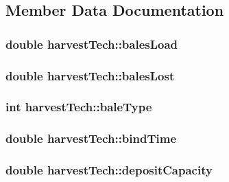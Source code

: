 \subsection{Member Data Documentation}
\hypertarget{classharvest_tech_a57a9eef8f134eb29850e764f16249fcf}{
\subsubsection[{balesLoad}]{\setlength{\rightskip}{0pt plus 5cm}double {\bf harvestTech::balesLoad}}}
\label{classharvest_tech_a57a9eef8f134eb29850e764f16249fcf}
\hypertarget{classharvest_tech_a6287a8add3f5b707b42a6565ecc67d87}{
\subsubsection[{balesLost}]{\setlength{\rightskip}{0pt plus 5cm}double {\bf harvestTech::balesLost}}}
\label{classharvest_tech_a6287a8add3f5b707b42a6565ecc67d87}
\hypertarget{classharvest_tech_ac17112c92ad4a22487df2fd5d3fc6c18}{
\subsubsection[{baleType}]{\setlength{\rightskip}{0pt plus 5cm}int {\bf harvestTech::baleType}}}
\label{classharvest_tech_ac17112c92ad4a22487df2fd5d3fc6c18}
\hypertarget{classharvest_tech_ac27e8d47de57e3eac8c8e2c018a30ac9}{
\subsubsection[{bindTime}]{\setlength{\rightskip}{0pt plus 5cm}double {\bf harvestTech::bindTime}}}
\label{classharvest_tech_ac27e8d47de57e3eac8c8e2c018a30ac9}
\hypertarget{classharvest_tech_ab042ca61e906ae05ff26c8ff4071a7e7}{
\subsubsection[{depositCapacity}]{\setlength{\rightskip}{0pt plus 5cm}double {\bf harvestTech::depositCapacity}}}
